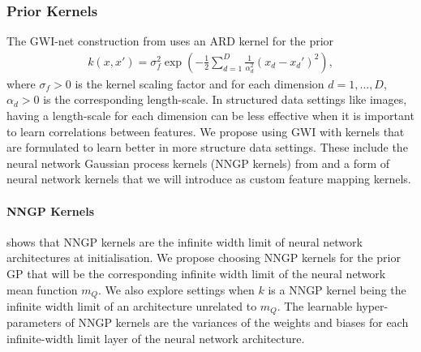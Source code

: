 \documentclass{article}
\numberwithin{equation}{section}
\begin{document}
\subsubsection{Prior Kernels}\label{prior-kernels}
The GWI-net construction from \cite{wild2022generalized} uses an ARD kernel for the prior
\begin{align}
    k(x, x') = \sigma^2_f \exp\left(-\frac{1}{2} \sum_{d=1}^D \frac{1}{\alpha_d^2}(x_d-x_d')^2\right),
\end{align}
where $\sigma_f > 0$ is the kernel scaling factor and for each dimension $d=1, \dots, D$, $\alpha_d >0$ is the corresponding length-scale.
In structured data settings like images, having a length-scale for each dimension can be less effective when it is important to learn correlations between features.
We propose using GWI with kernels that are formulated to learn better in more structure data settings. These include the neural network Gaussian process kernels (NNGP kernels) from \cite{novak2019neural} and a form of neural network kernels that we will introduce as custom feature mapping kernels.

\paragraph{NNGP Kernels} \cite{novak2019neural} shows that NNGP kernels are the infinite width limit of neural network architectures at initialisation.
We propose choosing NNGP kernels for the prior GP that will be the corresponding infinite width limit of the neural network mean function $m_Q$.
We also explore settings when $k$ is a NNGP kernel being the infinite width limit of an architecture unrelated to $m_Q$.
The learnable hyper-parameters of NNGP kernels are the variances of the weights and biases for each infinite-width limit layer of the neural network architecture.
\end{document}
